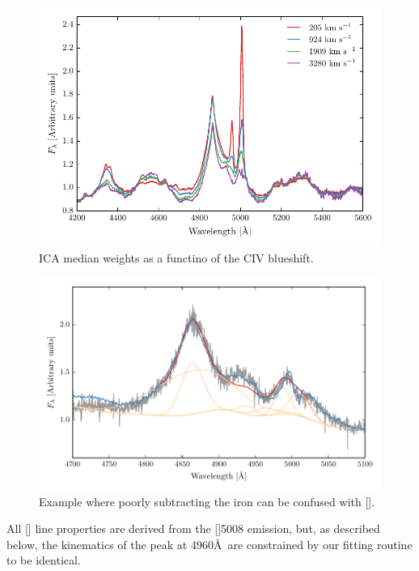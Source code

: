 \begin{figure}
    \centering
    \includegraphics[width=\columnwidth]{figures/chapter04/mfica_composites.pdf} 
    \caption{ICA median weights as a functino of the CIV blueshift.}     
    \label{fig:mfica_composites}
\end{figure}

\begin{figure}
    \centering
    \includegraphics[width=\columnwidth]{figures/chapter04/compare_gaussian_ica_QSO538.pdf} 
    \caption{Example where poorly subtracting the iron can be confused with [].}     
    \label{fig:compare_gaussian_ica}
\end{figure}

All [] line properties are derived from the []5008 emission, but, as described below, the kinematics of the peak at 4960\AA\, are constrained by our fitting routine to be identical.

